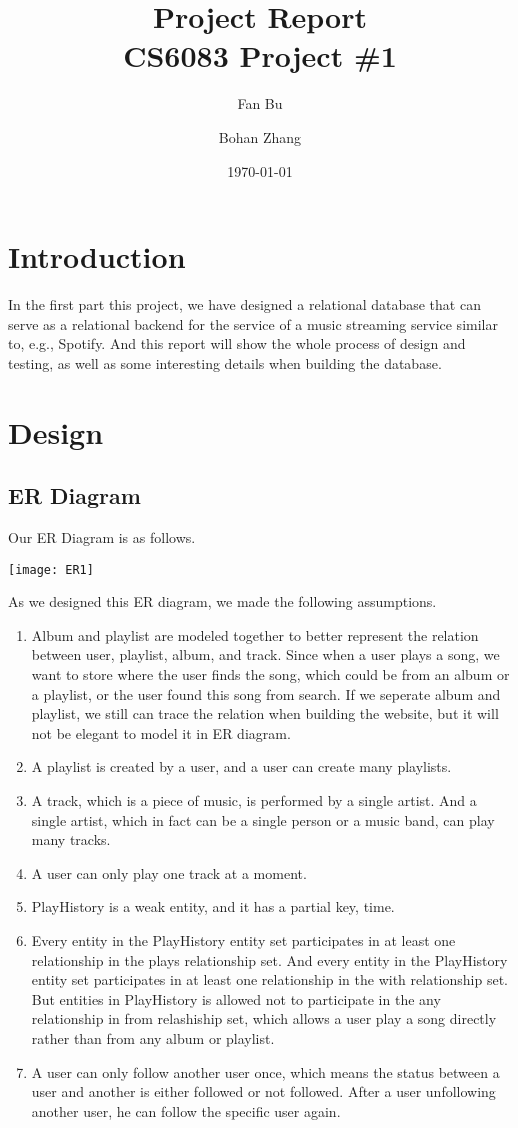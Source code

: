 \documentclass[letter, 12pt]{report}
\title{
	{Project Report}\\
	{\large CS6083 Project \#1}}
\author{Fan Bu\and Bohan Zhang}
\date{\today}
\begin{document}
	\maketitle
	
	\tableofcontents
	
	\chapter{Introduction}
	In the first part this project, we have designed a relational database that can serve as a relational
	backend for the service of a music streaming service similar to, e.g., Spotify. And this report will show the whole process of design and testing, as well as some interesting details when building the database.
	
	\chapter{Design}
	\section{ER Diagram}
	Our ER Diagram is as follows.
	\begin{center}
	\texttt{[image: ER1]}
	\end{center}
	As we designed this ER diagram, we made the following assumptions.
	\begin{enumerate}
		\item 
		Album and playlist are modeled together to better represent the relation between user, playlist, album, and track. Since when a user plays a song, we want to store where the user finds the song, which could be from an album or a playlist, or the user found this song from search. If we seperate album and playlist, we still can trace the relation when building the website, but it will not be elegant to model it in ER diagram.
		\item 
		A playlist is created by a user, and a user can create many playlists.
		\item 
		A track, which is a piece of music, is performed by a single artist. And a single artist, which in fact can be a single person or a music band, can play many tracks.
		\item 
		A user can only play one track at a moment.
		\item 
		PlayHistory is a weak entity, and it has a partial key, time.
		\item 
		Every entity in the PlayHistory entity set participates in at least one relationship in the plays relationship set. And every entity in the PlayHistory entity set participates in at least one relationship in the with relationship set. But entities in PlayHistory is allowed not to participate in the any relationship in from relashiship set, which allows a user play a song directly rather than from any album or playlist.
		\item 
		A user can only follow another user once, which means the status between a user and another is either followed or not followed. After a user unfollowing another user, he can follow the specific user again.
	\end{enumerate}
\end{document}
